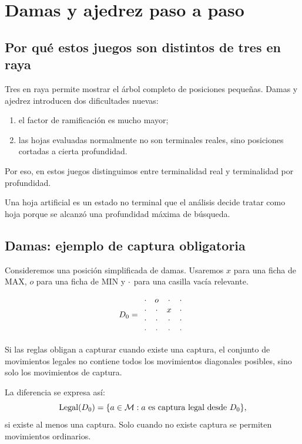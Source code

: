 \chapter{Damas y ajedrez paso a paso}

\section{Por qué estos juegos son distintos de tres en raya}

Tres en raya permite mostrar el árbol completo de posiciones pequeñas. Damas y ajedrez introducen dos dificultades nuevas:

\begin{enumerate}
\item el factor de ramificación es mucho mayor;
\item las hojas evaluadas normalmente no son terminales reales, sino posiciones cortadas a cierta profundidad.
\end{enumerate}

Por eso, en estos juegos distinguimos entre terminalidad real y terminalidad por profundidad.

\begin{definition}
Una hoja artificial es un estado no terminal que el análisis decide tratar como hoja porque se alcanzó una profundidad máxima de búsqueda.
\end{definition}

\section{Damas: ejemplo de captura obligatoria}

Consideremos una posición simplificada de damas. Usaremos $x$ para una ficha de MAX, $o$ para una ficha de MIN y $\cdot$ para una casilla vacía relevante.

\[
D_0=
\begin{array}{cccc}
\cdot & o & \cdot & \cdot\\
\cdot & \cdot & x & \cdot\\
\cdot & \cdot & \cdot & \cdot\\
\cdot & \cdot & \cdot & \cdot
\end{array}
\]

Si las reglas obligan a capturar cuando existe una captura, el conjunto de movimientos legales no contiene todos los movimientos diagonales posibles, sino solo los movimientos de captura.

\begin{formalbox}
La diferencia se expresa así:
\[
\operatorname{Legal}(D_0)=\{a\in\mathcal{M}: a\text{ es captura legal desde }D_0\},
\]
si existe al menos una captura. Solo cuando no existe captura se permiten movimientos ordinarios.
\end{formalbox}

